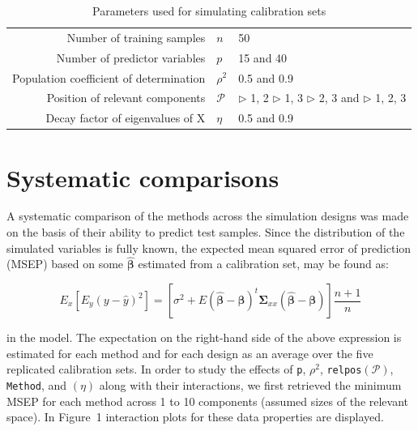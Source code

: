 \documentclass[num-refs]{wiley-article}
\begin{document}
\begin{table}[!ht]
\centering
\caption{Parameters used for simulating calibration sets}
\label{tab:parameters}
\begin{tabular}{rll}
Number of training samples              & $n$      & 50                \\
Number of predictor variables           & $p$      & 15 and 40         \\
Population coefficient of determination & $\rho^2$ & 0.5 and 0.9       \\
Position of relevant components         & $\mathcal{P}$
  & $\triangleright$ 1, 2 \;
  $\triangleright$ 1,  3 \; \newline
  $\triangleright$ 2,  3 and \;
  $\triangleright$ 1,  2, 3 \\
Decay factor of eigenvalues of X        & $\eta$   & 0.5 and 0.9
\end{tabular}
\end{table}

\section{Systematic comparisons}

A systematic comparison of the methods across the simulation designs was made on the basis of their ability to predict test samples. Since the distribution of the simulated variables is fully known, the expected mean squared error of prediction (MSEP) based on some $\hat{\bm{\beta}}$ estimated from a calibration set, may be found as:

\begin{equation*}
  E_x\left[E_y\left(y - \hat{y}\right)^2\right] =
  \left[\sigma^2 + E\left(\hat{\bm{\beta}} - \bm{\beta}\right)^t\bm{\Sigma}_{xx}\left(\hat{\bm{\beta}} - \bm{\beta}\right)\right]\frac{n+1}{n}
\end{equation*}

in the model. The expectation on the right-hand side of the above expression is estimated for each method and for each design as an average over the five replicated calibration sets. In order to study the effects of {\tt p}, $\rho^2$, {\tt relpos}$(\mathcal{P})$, {\tt Method}, and $(\eta)$ along with their interactions, we first retrieved the minimum MSEP for each method across 1 to 10 components (assumed sizes of the relevant space). In Figure~1 interaction plots for these data properties are displayed.

\end{document}
